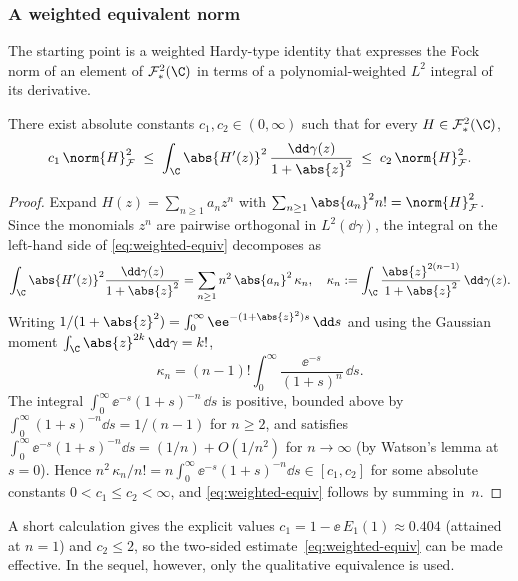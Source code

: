 \subsubsection{A weighted equivalent norm}\label{sec:weighted-norm}

The starting point is a weighted Hardy-type identity that expresses the
Fock norm of an element of $\mathcal{F}^2_\ast(\C)$ in terms of a polynomial-weighted
$L^2$ integral of its derivative.

\begin{lemma}\label{lem:weighted-equiv}
There exist absolute constants $c_1, c_2 \in (0,\infty)$ such that for
every $H \in \mathcal{F}^2_\ast(\C)$,
\begin{equation}\label{eq:weighted-equiv}
c_1\, \norm{H}_{\mathcal{F}}^2
\;\le\;
\int_{\C} \abs{H'(z)}^2\, \frac{\dd\gamma(z)}{1+\abs{z}^2}
\;\le\;
c_2\, \norm{H}_{\mathcal{F}}^2.
\end{equation}
\end{lemma}

\begin{proof}
Expand $H(z) = \sum_{n \ge 1} a_n z^n$ with $\sum_{n\ge1} \abs{a_n}^2 n!
= \norm{H}_{\mathcal{F}}^2$. Since the monomials $z^n$ are pairwise
orthogonal in $L^2(\dd\gamma)$, the integral on the left-hand side of
\eqref{eq:weighted-equiv} decomposes as
\[
\int_{\C} \abs{H'(z)}^2 \frac{\dd\gamma(z)}{1+\abs{z}^2}
= \sum_{n \ge 1} n^2\, \abs{a_n}^2\, \kappa_n,
\quad
\kappa_n := \int_{\C} \frac{\abs{z}^{2(n-1)}}{1+\abs{z}^2}\, \dd\gamma(z).
\]
Writing $1/(1+\abs{z}^2) = \int_0^\infty \ee^{-(1+\abs{z}^2)s}\,\dd s$ and
using the Gaussian moment $\int_{\C}\abs{z}^{2k}\,\dd\gamma = k!$,
\[
\kappa_n
= (n-1)! \int_0^\infty \frac{\ee^{-s}}{(1+s)^n}\, \dd s.
\]
The integral $\int_0^\infty \ee^{-s}(1+s)^{-n}\,\dd s$ is positive, bounded
above by $\int_0^\infty (1+s)^{-n}\dd s = 1/(n-1)$ for $n \ge 2$, and
satisfies $\int_0^\infty \ee^{-s}(1+s)^{-n}\dd s = (1/n) + O(1/n^2)$ for
$n \to \infty$ (by Watson's lemma at $s=0$). Hence
$n^2\,\kappa_n / n! = n \int_0^\infty \ee^{-s}(1+s)^{-n}\dd s \in [c_1, c_2]$
for some absolute constants $0 < c_1 \le c_2 < \infty$, and
\eqref{eq:weighted-equiv} follows by summing in~$n$.
\end{proof}

\begin{remark}
A short calculation gives the explicit values $c_1 = 1 - \ee\, E_1(1)
\approx 0.404$ (attained at $n=1$) and $c_2 \le 2$, so the
two-sided estimate~\eqref{eq:weighted-equiv} can be made effective. In
the sequel, however, only the qualitative equivalence is used.
\end{remark}

